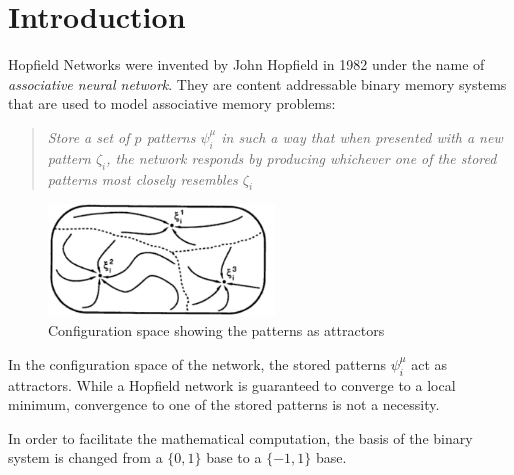 \section{Introduction}

Hopfield Networks were invented by John Hopfield in 1982 under the name of \textit{associative neural network}. They are content addressable binary memory systems that are used to model associative memory problems: 
\begin{quote}
\textit{Store a set of $p$ patterns $\psi_i^\mu$ in such a way that when presented with a new pattern $\zeta_i$, the network responds by producing whichever one of the stored patterns most closely resembles $\zeta_i$} \citep{Polk:2002fk}
\end{quote}

\begin{figure}
\includegraphics[width=6cm,angle=0]{PatternAttractors.png}
\caption{Configuration space showing the patterns as attractors}
\label{fig:PatternAttractors}
\end{figure}

In the configuration space of the network, the stored patterns $\psi_i^\mu$ act as attractors. While a Hopfield network is guaranteed to converge to a local minimum, convergence to one of the stored patterns is not a necessity. 

In order to facilitate the mathematical computation, the basis of the binary system is changed from a $\{0,1\}$ base to a $\{-1,1\}$ base.

